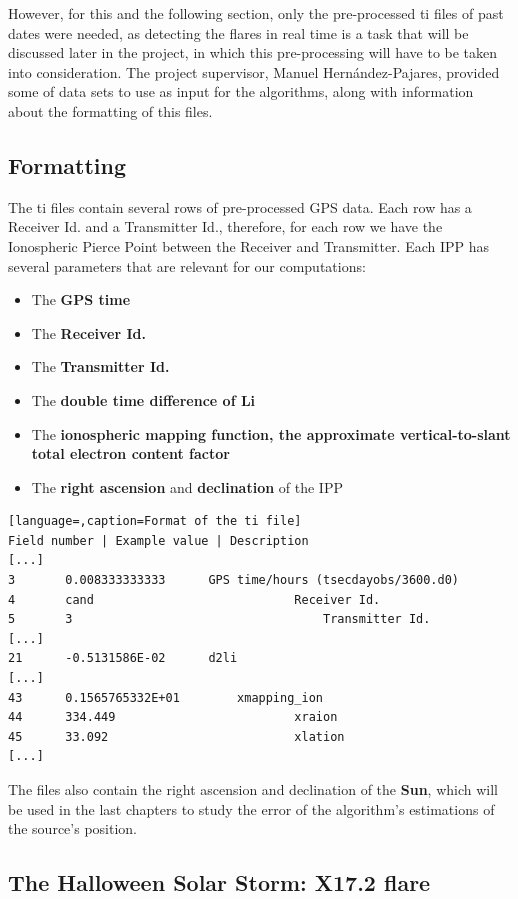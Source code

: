 However, for this and the following section, only the pre-processed ti files of past dates were needed, as detecting the flares in real time is a task that will be discussed later in the project, in which this pre-processing will have to be taken into consideration. The project supervisor, Manuel Hernández-Pajares, provided some of data sets to use as input for the algorithms, along with information about the formatting of this files.

\subsection{Formatting}

The ti files contain several rows of pre-processed GPS data. Each row has a Receiver Id. and a Transmitter Id., therefore, for each row we have the Ionospheric Pierce Point between the Receiver and Transmitter. Each IPP has several parameters that are relevant for our computations:

\begin{itemize}
\item The \textbf{GPS time}
\item The \textbf{Receiver Id.}
\item The \textbf{Transmitter Id.}
\item The \textbf{double time difference of Li}
\item The \textbf{ionospheric mapping function, the approximate vertical-to-slant total electron content factor}
\item The \textbf{right ascension} and \textbf{declination} of the IPP
\end{itemize}

\begin{minipage}{\linewidth}
\begin{lstlisting}[language=,caption=Format of the ti file]
Field number | Example value | Description
[...]
3 		0.008333333333		GPS time/hours (tsecdayobs/3600.d0)
4 		cand							Receiver Id.
5 		3									Transmitter Id.
[...]
21 		-0.5131586E-02		d2li
[...]
43 		0.1565765332E+01		xmapping_ion
44 		334.449							xraion
45 		33.092							xlation
[...]
\end{lstlisting}
\end{minipage}
The files also contain the right ascension and declination of the \textbf{Sun}, which will be used in the last chapters to study the error of the algorithm's estimations of the source's position.

\subsection{The Halloween Solar Storm: X17.2 flare}

